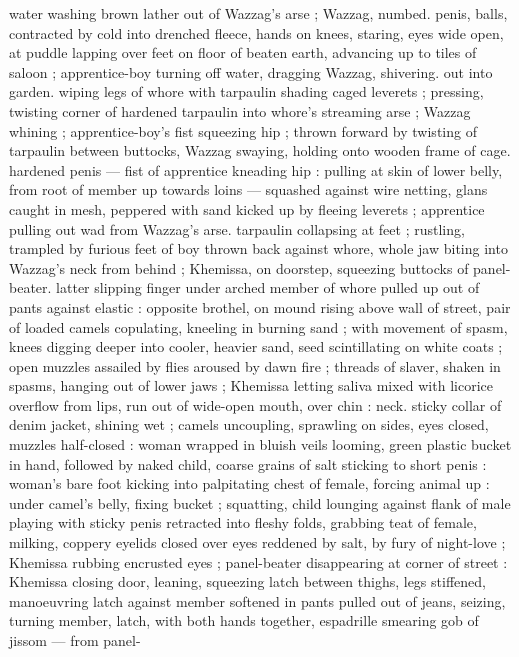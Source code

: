 {water washing brown lather out of Wazzag's arse ; Wazzag, numbed. 
penis, balls, contracted by cold into drenched fleece, hands on 
knees, staring, eyes wide open, at puddle lapping over feet on floor 
of beaten earth, advancing up to tiles of saloon ; apprentice-boy 
turning off water, dragging Wazzag, shivering. out into garden. 
wiping legs of whore with tarpaulin shading caged leverets ; 
pressing, twisting corner of hardened tarpaulin into whore's 
streaming arse ; Wazzag whining ; apprentice-boy's fist squeezing 
hip ; thrown forward by twisting of tarpaulin between buttocks, 
Wazzag swaying, holding onto wooden frame of cage. hardened 
penis --- fist of apprentice kneading hip : pulling at skin of lower 
belly, from root of member up towards loins --- squashed against 
wire netting, glans caught in mesh, peppered with sand kicked up by 
fleeing leverets ; apprentice pulling out wad from Wazzag's arse. 
tarpaulin collapsing at feet ; rustling, trampled by furious feet of boy 
thrown back against whore, whole jaw biting into Wazzag's neck from 
behind ; Khemissa, on doorstep, squeezing buttocks of panel-beater. 
latter slipping finger under arched member of whore pulled up out of 
pants against elastic : opposite brothel, on mound rising above wall 
of street, pair of loaded camels copulating, kneeling in burning sand 
; with movement of spasm, knees digging deeper into cooler, heavier 
sand, seed scintillating on white coats ; open muzzles assailed by 
flies aroused by dawn fire ; threads of slaver, shaken in spasms, 
hanging out of lower jaws ; Khemissa letting saliva mixed with licorice 
overflow from lips, run out of wide-open mouth, over chin : neck. 
sticky collar of denim jacket, shining wet ; camels uncoupling, 
sprawling on sides, eyes closed, muzzles half-closed : woman 
wrapped in bluish veils looming, green plastic bucket in hand, 
followed by naked child, coarse grains of salt sticking to short penis 
: woman's bare foot kicking into palpitating chest of female, forcing 
animal up : under camel's belly, fixing bucket ; squatting, child 
lounging against flank of male playing with sticky penis retracted 
into fleshy folds, grabbing teat of female, milking, coppery eyelids 
closed over eyes reddened by salt, by fury of night-love ; Khemissa 
rubbing encrusted eyes ; panel-beater disappearing at corner of 
street : Khemissa closing door, leaning, squeezing latch between 
thighs, legs stiffened, manoeuvring latch against member softened in 
pants pulled out of jeans, seizing, turning member, latch, with both 
hands together, espadrille smearing gob of jissom --- from panel- 
}
